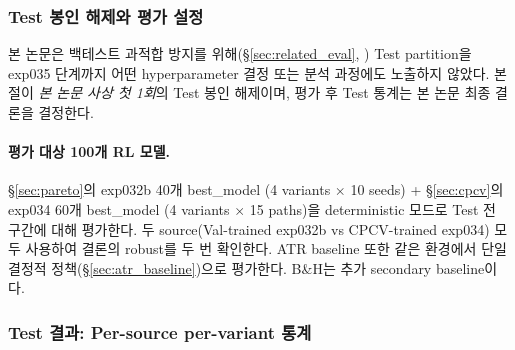 \documentclass[11pt, a4paper]{article}
\begin{document}
\subsubsection{Test 봉인 해제와 평가 설정}
\label{sec:oos_setup}

본 논문은 백테스트 과적합 방지를 위해(\S\ref{sec:related_eval},
\citealt{gort2022backtest}) Test partition을 exp035 단계까지 어떤 hyperparameter
결정 또는 분석 과정에도 노출하지 않았다. 본 절이 \emph{본 논문 사상 첫
1회}의 Test 봉인 해제이며, 평가 후 Test 통계는 본 논문 최종 결론을 결정한다.

\paragraph{평가 대상 100개 RL 모델.}
\S\ref{sec:pareto}의 exp032b 40개 best\_model (4 variants $\times$ 10 seeds) +
\S\ref{sec:cpcv}의 exp034 60개 best\_model (4 variants $\times$ 15 paths)을
deterministic 모드로 Test 전 구간에 대해 평가한다. 두 source(Val-trained
exp032b vs CPCV-trained exp034) 모두 사용하여 결론의 robust를 두 번 확인한다.
ATR baseline 또한 같은 환경에서 단일 결정적 정책(\S\ref{sec:atr_baseline})으로
평가한다. B\&H는 추가 secondary baseline이다.

\subsubsection{Test 결과: Per-source per-variant 통계}
\label{sec:oos_results}
\end{document}
